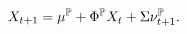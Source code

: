 \begin{equation} \label{eq:nXvarsP}
	X_{t+1} = \mu^{\mathbb{P}} + \Phi^{\mathbb{P}} X_{t}  + \Sigma \nu_{t+1}^{\mathbb{P}} .
\end{equation}